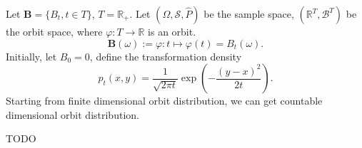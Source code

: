 \begin{example}
    Let $\mathbf{B} = \{B_t, t\in T\}$, $T = \mathbb{R}_+$.
	Let $(\Omega, \mathscr{S}, \hat{P})$ be the sample space,
	$(\mathbb{R}^T, \mathscr{B}^T)$ be the orbit space,
	where $\varphi: T\to \mathbb{R}$ is an orbit.
	\[
	\mathbf{B}(\omega) := \varphi: t\mapsto \varphi(t) = B_t(\omega).
	\]
	Initially, let $B_0 = 0$, define the transformation density
	\[
	p_t(x, y) = \frac{1}{\sqrt{2\pi t}}\exp\left(- \frac{(y - x)^2}{2t}\right).
	\]
	Starting from finite dimensional orbit distribution,
	we can get countable dimensional orbit distribution.

	TODO
\end{example}
